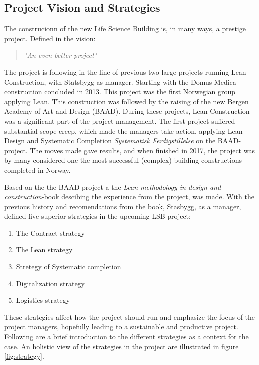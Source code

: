 \subsection{Project Vision and Strategies}
The construcionn of the new Life Science Building is, in many ways, a prestige project. Defined in the vision:
\begin{quote}
    \textit{"An even better project"}
\end{quote}
The project is following in the line of previous two large projects running Lean Construction, with Statsbygg as manager. Starting with the Domus Medica construction concluded in 2013. This project was the first Norwegian group applying Lean. This construction was followed by the raising of the new Bergen Academy of Art and Design (BAAD). During these projects, Lean Construction was a significant part of the project management. The first project suffered substantial scope creep, which made the managers take action, applying Lean Design and Systematic Completion \textit{Systematisk Ferdigstillelse} on the BAAD-project. The moves made gave results, and when finished in 2017, the project was by many considered one the most successful (complex) building-constructions completed in Norway.

Based on the the BAAD-project a the \textit{Lean methodology in design and construction}-book \cite{lean_i_praksis} descibing the experience from the project, was made. With the previous history and recomendations from the book, Stasbygg, as a manager, defined five superior strategies in the upcoming LSB-project: 
\begin{enumerate}
    \item The Contract strategy
    \item The Lean strategy
    \item Stretegy of Systematic completion
    \item Digitalization strategy
    \item Logistics strategy
\end{enumerate}
These strategies affect how the project should run and emphasize the focus of the project managers, hopefully leading to a sustainable and productive project. Following are a brief introduction to the different strategies as a context for the case. An holistic view of the strategies in the project are illustrated in figure \ref{fig:strategy}. 

